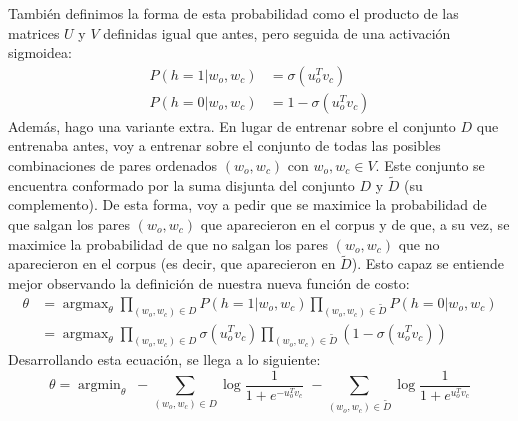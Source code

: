 \documentclass[12pt]{article}
\DeclareMathOperator*{\argmax}{argmax}
\DeclareMathOperator*{\argmin}{argmin}
\begin{document}
También definimos la forma de esta probabilidad como el producto de las matrices $U$ y $V$ definidas igual que antes, pero seguida de una activación sigmoidea: 
\begin{align*}
P(h = 1 | w_o,w_c) &= \sigma(u_o^Tv_c) \\
P(h = 0 | w_o,w_c) &= 1 - \sigma(u_o^Tv_c)
\end{align*}
Además, hago una variante extra. En lugar de entrenar sobre el conjunto $D$ que entrenaba antes, voy a entrenar sobre el conjunto de todas las posibles combinaciones de pares ordenados $(w_o,w_c)$ con $w_o,w_c \in V$. Este conjunto se encuentra conformado por la suma disjunta del conjunto $D$ y $\tilde{D}$ (su complemento). De esta forma, voy a pedir que se maximice la probabilidad de que salgan los pares $(w_o,w_c)$ que aparecieron en el corpus y de que, a su vez, se maximice la probabilidad de que no salgan los pares $(w_o,w_c)$ que no aparecieron en el corpus (es decir, que aparecieron en $\tilde{D}$). Esto capaz se entiende mejor observando la definición de nuestra nueva función de costo:
\begin{align*}
\theta &= \argmax_\theta \prod_{(w_o,w_c) \in D} P(h = 1 | w_o,w_c) \prod_{(w_o,w_c) \in \tilde{D}} P(h = 0 | w_o,w_c) \\
&= \argmax_\theta \prod_{(w_o,w_c) \in D} \sigma(u_o^Tv_c) \prod_{(w_o,w_c) \in \tilde{D}} \left(1-\sigma(u_o^Tv_c)\right)
\end{align*}
Desarrollando esta ecuación, se llega a lo siguiente:
\begin{equation}
\theta = \argmin_\theta \; - \sum_{(w_o,w_c) \in D} \log \frac{1}{1+e^{-u_o^Tv_c}}\; - \sum_{(w_o,w_c) \in \tilde{D}} \log \frac{1}{1+e^{u_o^Tv_c}}
\end{equation}
\end{document}
